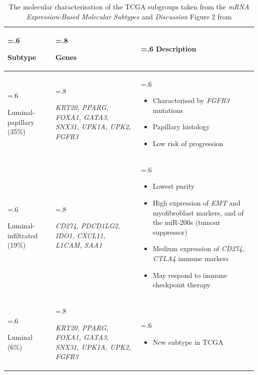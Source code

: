 \begin{table}[H]
\centering
\caption{The molecular characterisation of the TCGA subgroups taken from the \textit{mRNA Expression-Based Molecular Subtypes} and \textit{Discussion} Figure 2 from \cite{Robertson2017-mg}}
    \begin{tabularx}{\textwidth}{
      >{\hsize=.6\hsize\raggedright\arraybackslash}X
      >{\hsize=.8\hsize\raggedright\arraybackslash}X
      >{\hsize=.6\hsize\arraybackslash}X
    }
    \toprule
    Subtype & Genes & Description \\
    \midrule
    Luminal-papillary (35\%) & \textit{KRT20, PPARG, FOXA1, GATA3, SNX31, UPK1A, UPK2, FGFR3} & 
    \begin{itemize}[leftmargin=*, nosep, after=\vspace{-\baselineskip}, before=\vspace{-.6\baselineskip}]
        \item Characterised by \textit{FGFR3} mutations
        \item Papillary histology
        \item Low risk of progression
    \end{itemize} \\
    \midrule
    Luminal-infiltrated (19\%) & \textit{CD274, PDCD1LG2, IDO1, CXCL11, L1CAM, SAA1} & 
    \begin{itemize}[leftmargin=*, nosep, after=\vspace{-\baselineskip}, before=\vspace{-.6\baselineskip}]
        \item Lowest purity
        \item High expression of \textit{EMT} and myofibroblast markers, and of the miR-200s (tumour suppressor)
        \item Medium expression of \textit{CD274, CTLA4} immune markers
        \item May respond to immune checkpoint therapy
    \end{itemize} \\
    \midrule
    Luminal (6\%) & \textit{KRT20, PPARG, FOXA1, GATA3, SNX31, UPK1A, UPK2, FGFR3} & 
    \begin{itemize}[leftmargin=*, nosep, after=\vspace{-\baselineskip}, before=\vspace{-.6\baselineskip}]
        \item New subtype in TCGA
    \end{itemize} \\

\end{tabularx}
\end{table}
